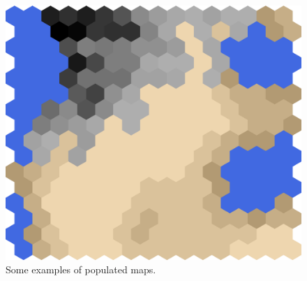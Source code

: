 \documentclass[conference]{IEEEtran}
\theoremstyle{definition}
\begin{document}
\begin{figure}
\begin{minipage}{.19\textwidth}
		\includegraphics[width=\textwidth]{tf-j}
	\end{minipage}
	\caption{Some examples of populated maps.}
	\label{fig:mapsss}
\end{figure}
\end{document}
